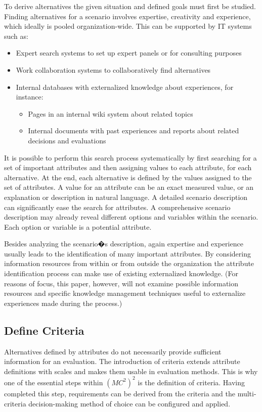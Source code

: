 \documentclass[journal,final,a4paper,twoside]{IEEEtran}
\begin{document}
To derive alternatives the given situation and defined goals must first be studied. Finding alternatives for a scenario involves expertise, creativity and experience, which ideally is pooled organization-wide. This can be supported by IT systems such as:
\begin{itemize}
\item Expert search systems to set up expert panels or for consulting purposes
\item Work collaboration systems to collaboratively find alternatives
\item Internal databases with externalized knowledge about experiences, for instance:
	\begin{itemize}
	\item Pages in an internal wiki system about related topics
	\item Internal documents with past experiences and reports about related decisions and evaluations
	\end{itemize}
\end{itemize}
It is possible to perform this search process systematically by first searching for a set of important attributes and then assigning values to each attribute, for each alternative. At the end, each alternative is defined by the values assigned to the set of attributes. A value for an attribute can be an exact measured value, or an explanation or description in natural language. 
A detailed scenario description can significantly ease the search for attributes. A comprehensive scenario description may already reveal different options and variables within the scenario. Each option or variable is a potential attribute. 

Besides analyzing the scenario�s description, again expertise and experience usually leads to the identification of many important attributes. By considering information resources from within or from outside the organization the attribute identification process can make use of existing externalized knowledge. (For reasons of focus, this paper, however, will not examine possible information resources and specific knowledge management techniques useful to externalize experiences made during the process.)



\subsection{Define Criteria}
Alternatives defined by attributes do not necessarily provide sufficient information for an evaluation. The introduction of criteria extends attribute definitions with scales and makes them usable in evaluation methods. This is why one of the essential steps within $(MC^2)^2$ is the definition of criteria. Having completed this step, requirements can be derived from the criteria and the multi-criteria decision-making method of choice can be configured and applied.
\end{document}
